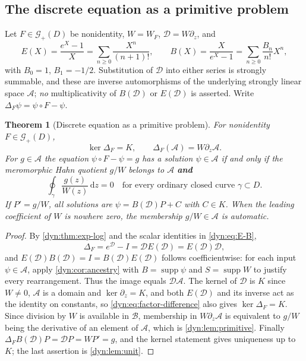\documentclass[11pt,letterpaper]{article}
\newtheorem{theorem}{Theorem}[section]
\theoremstyle{definition}
\theoremstyle{remark}
\newcommand{\GG}{\mathscr G}
\newcommand{\AAA}{\mathscr A}
\newcommand{\supp}{\operatorname{supp}}
\newcommand{\dd}{\,\mathrm d}
\numberwithin{equation}{section}
\begin{document}
\subsection{The discrete equation as a primitive problem}
Let $F\in\GG_+(D)$ be nonidentity, $W=W_F$, $\mathscr D=W\partial_z$, and
\begin{equation}\label{dyn:eq:E-B}
 E(X)=\frac{e^{X}-1}{X}=\sum_{n\ge0}\frac{X^{n}}{(n+1)!},\qquad
 B(X)=\frac{X}{e^{X}-1}=\sum_{n\ge0}\frac{B_n}{n!}X^{n},
\end{equation}
with $B_0=1$, $B_1=-1/2$. Substitution of $\mathscr D$ into either series
is strongly summable, and these are inverse automorphisms of the underlying
strongly linear space $\AAA$; \emph{no} multiplicativity of $B(\mathscr D)$
or $E(\mathscr D)$ is asserted. Write $\Delta_F\psi=\psi\circ F-\psi$.

\begin{theorem}[Discrete equation as a primitive problem]
\label{dyn:thm:difference}
For nonidentity $F\in\GG_+(D)$,
\begin{equation}\label{dyn:eq:images}
 \ker\Delta_F=K,\qquad \Delta_F(\AAA)=W\partial_z\AAA .
\end{equation}
For $g\in\AAA$ the equation $\psi\circ F-\psi=g$ has a solution
$\psi\in\AAA$ if and only if the meromorphic Hahn quotient $g/W$ belongs
to $\AAA$ \textbf{and}
\begin{equation}\label{dyn:eq:periodcondition}
 \oint_\gamma\frac{g(z)}{W(z)}\dd z=0
 \quad\text{for every ordinary closed curve }\gamma\subset D .
\end{equation}
If $P'=g/W$, all solutions are $\psi=B(\mathscr D)P+C$ with $C\in K$. When
the leading coefficient of $W$ is nowhere zero, the membership
$g/W\in\AAA$ is automatic.
\end{theorem}
\begin{proof}
By \cref{dyn:thm:exp-log} and the scalar identities in
\eqref{dyn:eq:E-B},
\begin{equation}\label{dyn:eq:factor-difference}
 \Delta_F=e^{\mathscr D}-I=\mathscr DE(\mathscr D)=E(\mathscr D)\mathscr D,
\end{equation}
and $E(\mathscr D)B(\mathscr D)=I=B(\mathscr D)E(\mathscr D)$ follows
coefficientwise: for each input $\psi\in\AAA$, apply
\cref{dyn:cor:ancestry} with $B=\supp\psi$ and $S=\supp W$ to justify
every rearrangement. Thus the image equals $\mathscr D\AAA$. The kernel of
$\mathscr D$ is $K$ since
$W\ne0$, $\AAA$ is a domain and $\ker\partial_z=K$, and both
$E(\mathscr D)$ and its inverse act as the identity on constants, so
\eqref{dyn:eq:factor-difference} also gives $\ker\Delta_F=K$. Since
division by $W$ is available in $\mathcal B$, membership in
$W\partial_z\AAA$ is equivalent to $g/W$ being the derivative of an element
of $\AAA$, which is \cref{dyn:lem:primitive}. Finally
$\Delta_FB(\mathscr D)P=\mathscr DP=WP'=g$, and the kernel statement gives
uniqueness up to $K$; the last assertion is \cref{dyn:lem:unit}.
\end{proof}
\end{document}
